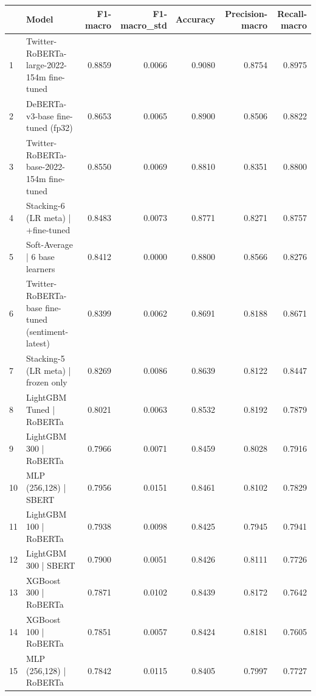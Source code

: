 \begin{tabular}{llrrrrr}
\toprule
 & Model & F1-macro & F1-macro_std & Accuracy & Precision-macro & Recall-macro \\
\midrule
1 & Twitter-RoBERTa-large-2022-154m fine-tuned & 0.8859 & 0.0066 & 0.9080 & 0.8754 & 0.8975 \\
2 & DeBERTa-v3-base fine-tuned (fp32) & 0.8653 & 0.0065 & 0.8900 & 0.8506 & 0.8822 \\
3 & Twitter-RoBERTa-base-2022-154m fine-tuned & 0.8550 & 0.0069 & 0.8810 & 0.8351 & 0.8800 \\
4 & Stacking-6 (LR meta) | +fine-tuned & 0.8483 & 0.0073 & 0.8771 & 0.8271 & 0.8757 \\
5 & Soft-Average | 6 base learners & 0.8412 & 0.0000 & 0.8800 & 0.8566 & 0.8276 \\
6 & Twitter-RoBERTa-base fine-tuned (sentiment-latest) & 0.8399 & 0.0062 & 0.8691 & 0.8188 & 0.8671 \\
7 & Stacking-5 (LR meta) | frozen only & 0.8269 & 0.0086 & 0.8639 & 0.8122 & 0.8447 \\
8 & LightGBM Tuned | RoBERTa & 0.8021 & 0.0063 & 0.8532 & 0.8192 & 0.7879 \\
9 & LightGBM 300 | RoBERTa & 0.7966 & 0.0071 & 0.8459 & 0.8028 & 0.7916 \\
10 & MLP (256,128) | SBERT & 0.7956 & 0.0151 & 0.8461 & 0.8102 & 0.7829 \\
11 & LightGBM 100 | RoBERTa & 0.7938 & 0.0098 & 0.8425 & 0.7945 & 0.7941 \\
12 & LightGBM 300 | SBERT & 0.7900 & 0.0051 & 0.8426 & 0.8111 & 0.7726 \\
13 & XGBoost 300 | RoBERTa & 0.7871 & 0.0102 & 0.8439 & 0.8172 & 0.7642 \\
14 & XGBoost 100 | RoBERTa & 0.7851 & 0.0057 & 0.8424 & 0.8181 & 0.7605 \\
15 & MLP (256,128) | RoBERTa & 0.7842 & 0.0115 & 0.8405 & 0.7997 & 0.7727 \\
\bottomrule
\end{tabular}
